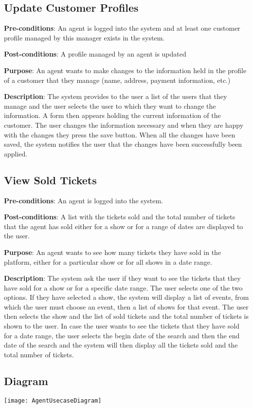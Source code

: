\subsection{Update Customer Profiles}
\textbf{Pre-conditions}: An agent is logged into the system and at least one customer profile managed by this manager exists in the system.

\textbf{Post-conditions}: A profile managed by an agent is updated

\textbf{Purpose}: An agent wants to make changes to the information held in the profile of a customer that they manage (name, address, payment information, etc.)

\textbf{Description}: The system provides to the user a list of the users that they manage and the user selects the user to which they want to change the information. A form then appears holding the current information of the customer. The user changes the information necessary and when they are happy with the changes they press the save button. When all the changes have been saved, the system notifies the user that the changes have been successfully been applied.

\subsection{View Sold Tickets}
\textbf{Pre-conditions}: An agent is logged into the system.

\textbf{Post-conditions}: A list with the tickets sold and the total number of tickets that the agent has sold either for a show or for a range of dates are displayed to the user.

\textbf{Purpose}: An agent wants to see how many tickets they have sold in the platform, either for a particular show or for all shows in a date range.

\textbf{Description}: The system ask the user if they want to see the tickets that they have sold for a show or for a specific date range. The user selects one of the two options. If they have selected a show, the system will display a list of events, from which the user must choose an event, then a list of shows for that event. The user then selects the show and the list of sold tickets and the total number of tickets is shown to the user. In case the user wants to see the tickets that they have sold for a date range, the user selects the begin date of the search and then the end date of the search and the system will then display all the tickets sold and the total number of tickets.

\subsection{Diagram}
\texttt{[image: AgentUsecaseDiagram]}
